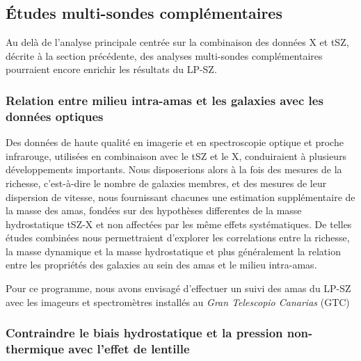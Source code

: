 \subsection{\'Etudes multi-sondes complémentaires}

Au delà de l'analyse principale centrée sur la combinaison des données
X et tSZ, décrite à la section précédente, des analyses multi-sondes
complémentaires pourraient encore enrichir les résultats du LP-SZ. 

\subsubsection{Relation entre milieu intra-amas et les galaxies avec les
  données optiques}

Des données de haute qualité en imagerie et en spectroscopie optique
et proche infrarouge, utilisées en combinaison avec le tSZ et le X,
conduiraient à plusieurs développements importants. Nous disposerions
alors à la fois des mesures de la richesse, c'est-à-dire le nombre de
galaxies membres, et des mesures de leur dispersion de vitesse, nous
fournissant chacunes une estimation supplémentaire de la masse des
amas, fondées sur des hypothèses differentes de la masse hydrostatique
tSZ-X et non affectées par les même effets systématiques. De telles
études combinées nous permettraient d'explorer les correlations entre
la richesse, la masse dynamique et la masse hydrostatique et plus
généralement la relation entre les propriétés des galaxies au sein des
amas et le milieu intra-amas.

Pour ce programme, nous avons envisagé d'effectuer un suivi des amas
du LP-SZ avec les imageurs et spectromètres installés au \emph{Gran
  Telescopio Canarias} (GTC)


\subsubsection{Contraindre le biais hydrostatique et la pression
  non-thermique avec l'effet de lentille}

